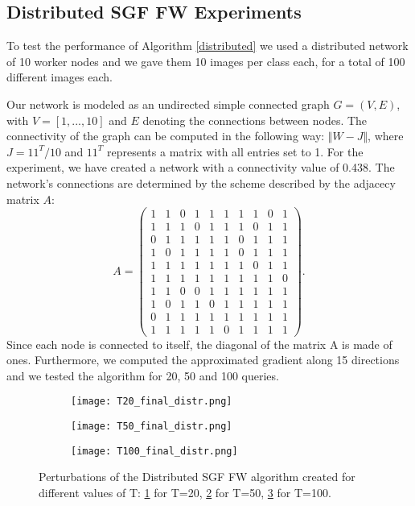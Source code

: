 \subsection{Distributed SGF FW Experiments}
To test the performance of Algorithm \ref{distributed} we used a distributed network of 10 worker nodes and we
gave them 10 images per class each, for a total of 100 different images each.

Our network is modeled as an undirected simple connected graph $G = (V,E)$, with $V = [1,...,10]$ and $E$ denoting
the connections between nodes. The connectivity of the graph can be computed in the following way: $\Vert W- J \Vert$,
where $J= 11^T/10$ and $11^T$ represents a matrix with all entries set to 1. For the experiment, we have created a network
with a connectivity value of 0.438. The network's connections are determined by the scheme described by the adjacecy
matrix $A$:
\[ A =
\begin{pmatrix}
1& 1& 0& 1& 1& 1& 1& 1& 0& 1\\
1& 1& 1& 0& 1& 1& 1& 0& 1& 1\\
0& 1& 1& 1& 1& 1& 0& 1& 1& 1\\
1& 0& 1& 1& 1& 1& 0& 1& 1& 1\\
1& 1& 1& 1& 1& 1& 1& 0& 1& 1\\
1& 1& 1& 1& 1& 1& 1& 1& 1& 0\\
1& 1& 0& 0& 1& 1& 1& 1& 1& 1\\
1& 0& 1& 1& 0& 1& 1& 1& 1& 1\\
0& 1& 1& 1& 1& 1& 1& 1& 1& 1\\
1& 1& 1& 1& 1& 0& 1& 1& 1& 1
\end{pmatrix}
.\]
Since each node is connected to itself, the diagonal of the matrix A is made of ones.
 Furthermore, we computed the approximated gradient along 15 directions and we tested
the algorithm for 20, 50 and 100 queries.

\begin{figure}%
	\centering
	\begin{subfigure}[b]{0.15\textwidth}
		\centering
		\texttt{[image: T20\_final\_distr.png]}
		\caption{}
		\label{fig:distributed_perturbation_20}
	\end{subfigure}
	\hfill
	\begin{subfigure}[b]{0.15\textwidth}
		\texttt{[image: T50\_final\_distr.png]}
		\caption{}
		\label{fig:variance-distributed_perturbation_50}
	\end{subfigure}
	\hfill
	\begin{subfigure}[b]{0.15\textwidth}
		\texttt{[image: T100\_final\_distr.png]}
		\caption{}
		\label{fig:distributed_perturbation_100}
	\end{subfigure}
	\caption{Perturbations of the Distributed SGF FW algorithm created for different values of T:
	  \ref{fig:distributed_perturbation_20} for T=20, \ref{fig:variance-distributed_perturbation_50} for T=50, \ref{fig:distributed_perturbation_100} for T=100.}
	\label{fig:perturbations}
\end{figure}

